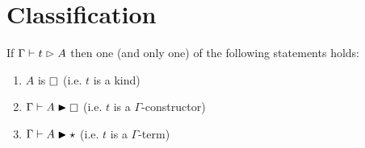 \section{Classification}


\begin{theorem}[Classification]
    If $\Gamma \vdash t \vartriangleright A$ then one (and only one) of the following statements holds:
    \begin{enumerate}
        \item $A$ is $\kind$ (i.e. $t$ is a kind)
        \item $\Gamma \vdash A \cinfr \kind$ (i.e. $t$ is a $\Gamma$-constructor)
        \item $\Gamma \vdash A \blacktriangleright \star$ (i.e. $t$ is a $\Gamma$-term)
    \end{enumerate}
\end{theorem}
